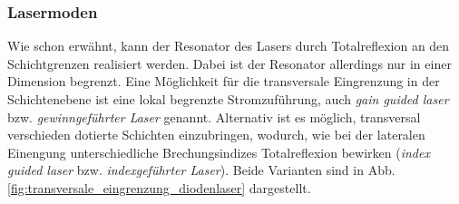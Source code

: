\subsubsection{Lasermoden}\label{subsubsec:lasermoden}
Wie schon erwähnt, kann der Resonator des Lasers durch Totalreflexion an den
Schichtgrenzen realisiert werden. Dabei ist der Resonator allerdings nur in
einer Dimension begrenzt. Eine Möglichkeit für die transversale Eingrenzung in
der Schichtenebene ist eine lokal begrenzte Stromzuführung, auch \textit{gain
guided laser} bzw. \textit{gewinngeführter Laser} genannt. Alternativ ist es
möglich, transversal verschieden dotierte Schichten einzubringen, wodurch, wie
bei der lateralen Einengung unterschiedliche Brechungsindizes Totalreflexion
bewirken (\textit{index guided laser} bzw. \textit{indexgeführter Laser}). Beide
Varianten sind in Abb. \ref{fig:transversale_eingrenzung_diodenlaser}
dargestellt.
